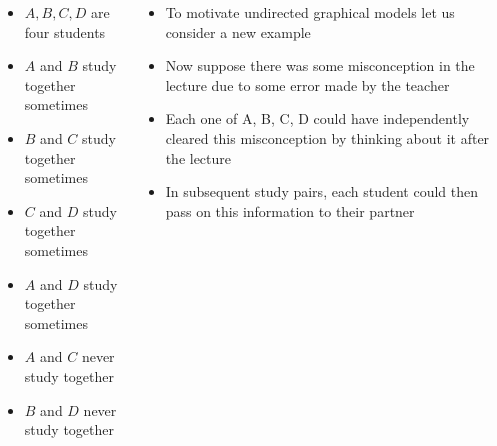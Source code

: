 \begin{frame}
	\begin{columns}
	\begin{overlayarea}{\textwidth}{\textheight}
		\vspace{0.1in}
		\begin{center}
		\end{center}
		\begin{itemize}\justifying
			\item<1-> $A,B,C,D$ are four students
			\item<1-> $A$ and $B$ study together sometimes
			\item<1-> $B$ and $C$ study together sometimes
			\item<1-> $C$ and $D$ study together sometimes
			\item<1-> $A$ and $D$ study together sometimes
			\item<1-> $A$ and $C$ never study together
			\item<1-> $B$ and $D$ never study together
		\end{itemize}
	\end{overlayarea}
		\begin{overlayarea}{\textwidth}{\textheight}
			\begin{itemize}\justifying
			\item<1-> To motivate undirected graphical models let us consider a new example
			\item<2-> Now suppose there was some misconception in the lecture due to some error made by the teacher
			\item<3-> Each one of A, B, C, D could have independently cleared this misconception by thinking about it after 
			the lecture
			\item<4-> In subsequent study pairs, each student could then pass on this information to their partner
			\end{itemize}
		\end{overlayarea}
	\end{columns}
\end{frame}


